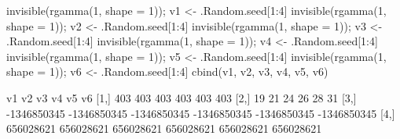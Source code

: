 \begin{Schunk}
\begin{Sinput}
 invisible(rgamma(1, shape = 1)); v1 <- .Random.seed[1:4]
 invisible(rgamma(1, shape = 1)); v2 <- .Random.seed[1:4]
 invisible(rgamma(1, shape = 1)); v3 <- .Random.seed[1:4]
 invisible(rgamma(1, shape = 1)); v4 <- .Random.seed[1:4]
 invisible(rgamma(1, shape = 1)); v5 <- .Random.seed[1:4]
 invisible(rgamma(1, shape = 1)); v6 <- .Random.seed[1:4]
 cbind(v1, v2, v3, v4, v5, v6)
\end{Sinput}
\begin{Soutput}
              v1          v2          v3          v4          v5          v6
[1,]         403         403         403         403         403         403
[2,]          19          21          24          26          28          31
[3,] -1346850345 -1346850345 -1346850345 -1346850345 -1346850345 -1346850345
[4,]   656028621   656028621   656028621   656028621   656028621   656028621
\end{Soutput}
\end{Schunk}
